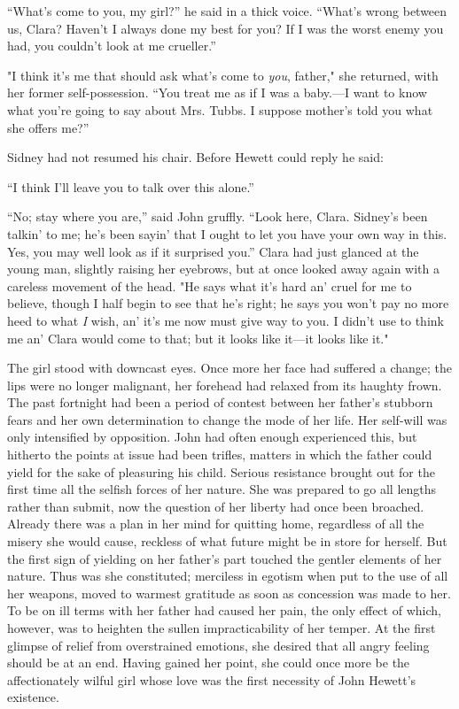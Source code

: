 ``What's come to you, my girl?'' he said in a thick voice. ``What's
wrong between us, Clara? Haven't I always done my best for you? If I was
the worst enemy you had, you couldn't look at me crueller.''

"I think it's me that should ask what's come to \emph{you}, father," she
returned, with her former self-possession. ``You treat me as if I was a
baby.---I want to know what you're going to say about Mrs. Tubbs. I
suppose mother's told you what she offers me?''

Sidney had not resumed his chair. Before Hewett could reply he said:

``I think I'll leave you to talk over this alone.''

``No; stay where you are,'' said John {}gruffly. ``Look here, Clara.
Sidney's been talkin' to me; he's been sayin' that I ought to let you
have your own way in this. Yes, you may well look as if it surprised
you.'' Clara had just glanced at the young man, slightly raising her
eyebrows, but at once looked away again with a careless movement of the
head. "He says what it's hard an' cruel for me to believe, though I half
begin to see that he's right; he says you won't pay no more heed to what
\emph{I} wish, an' it's me now must give way to you. I didn't use to
think me an' Clara would come to that; but it looks like it---it looks
like it."

The girl stood with downcast eyes. Once more her face had suffered a
change; the lips were no longer malignant, her forehead had relaxed from
its haughty frown. The past fortnight had been a period of contest
between her father's stubborn fears and her own determination to change
the mode of her life. Her self-will was only intensified by opposition.
John had often enough experienced this, but hitherto the points at
{}issue had been trifles, matters in which the father could yield for
the sake of pleasuring his child. Serious resistance brought out for the
first time all the selfish forces of her nature. She was prepared to go
all lengths rather than submit, now the question of her liberty had once
been broached. Already there was a plan in her mind for quitting home,
regardless of all the misery she would cause, reckless of what future
might be in store for herself. But the first sign of yielding on her
father's part touched the gentler elements of her nature. Thus was she
constituted; merciless in egotism when put to the use of all her
weapons, moved to warmest gratitude as soon as concession was made to
her. To be on ill terms with her father had caused her pain, the only
effect of which, however, was to heighten the sullen impracticability of
her temper. At the first glimpse of relief from overstrained emotions,
she desired that all angry feeling should be at an end. Having gained
her point, she could once more be the {}affectionately wilful girl whose
love was the first necessity of John Hewett's existence.

